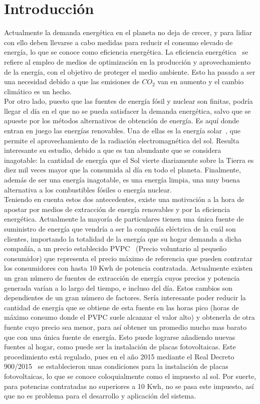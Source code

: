 \chapter{Introducción}
\label{cap:Introduccion}
Actualmente la demanda energética en el planeta no deja de crecer, y para lidiar con ello deben llevarse a cabo medidas para reducir el consumo elevado de energía, lo que se conoce como eficiencia energética. La eficiencia energética~\cite{GarSa12} se refiere al empleo de medios de optimización en la producción y aprovechamiento de la energía, con el objetivo de proteger el medio ambiente. Esto ha pasado a ser una necesidad debido a que las emisiones de $ CO_{2} $ van en aumento y el cambio climático es un hecho.\\

Por otro lado, puesto que las fuentes de energía fósil y nuclear son finitas, podría llegar el día en el que no se pueda satisfacer la demanda energética, salvo que se apueste por los métodos alternativos de obtención de energía. Es aquí donde entran en juego las energías renovables. Una de ellas es la energía solar~\cite{Perp12}, que permite el aprovechamiento de la radiación electromagnética del sol. Resulta interesante su estudio, debido a que es tan abundante que se considera inagotable: la cantidad de energía que el Sol vierte diariamente sobre la Tierra es diez mil veces mayor que la consumida al día en todo el planeta. Finalmente, además de ser una energía inagotable, es una energía limpia, una muy buena alternativa a los combustibles fósiles o energía nuclear. \\

Teniendo en cuenta estos dos antecedentes, existe una motivación a la hora de apostar por medios de extracción de energía renovables y por la eficiencia energética. Actualmente la mayoría de particulares tienen una única fuente de suministro de energía que vendría a ser la compañía eléctrica de la cuál son clientes, importando la totalidad de la energía que su hogar demanda a dicha compañía, a un precio establecido \gls{PVPC}~\cite{Ree14} (Precio voluntario al pequeño consumidor) que representa el precio máximo de referencia que pueden contratar los consumidores con hasta 10 Kwh de potencia contratada. Actualmente existen un gran número de fuentes de extracción de energía cuyos precios y potencia generada varían a lo largo del tiempo, e incluso del día. Estos cambios son dependientes de un gran número de factores. Sería interesante poder reducir la cantidad de energía que se obtiene de esta fuente en las horas pico (horas de máximo consumo donde el \gls{PVPC} suele alcanzar el valor alto) y obtenerla de otra fuente cuyo precio sea menor, para así obtener un promedio mucho mas barato que con una única fuente de energía. Esto puede lograrse añadiendo nuevas fuentes al hogar, como puede ser la instalación de placas fotovoltaicas. Este procedimiento está regulado, pues en el año 2015 mediante el Real Decreto 900/2015~\cite{Boe15} se establecieron unas condiciones para la instalación de placas fotovoltaicas, lo que se conoce coloquialmente como el impuesto al sol. Por suerte, para potencias contratadas no superiores a 10 Kwh, no se pasa este impuesto, así que no es problema para el desarrollo y aplicación del sistema.\\

